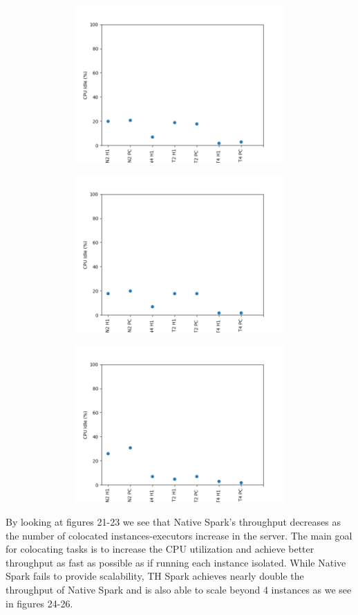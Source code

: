 \documentclass[twocolumn,10pt]{asme2e}
\begin{document}
\begin{figure}[h!]
        \includegraphics[width=13cm,height=6cm]{LINR_64.png}
\end{figure}

\begin{figure}[h!]
        \includegraphics[width=13cm,height=6cm]{LOGR_64.png}
\end{figure}

\begin{figure}[h!]
        \includegraphics[width=13cm,height=6cm]{CC_64.png}
\end{figure}

By looking at figures 21-23 we see that Native Spark's throughput decreases as the number of colocated instances-executors increase in the server. The main goal for colocating tasks is to increase the CPU utilization and achieve better throughput as fast as possible as if running each instance isolated. While Native Spark fails to provide scalability, TH Spark achieves nearly double the throughput of Native Spark and is also able to scale beyond 4 instances as we see in figures 24-26.
\end{document}

